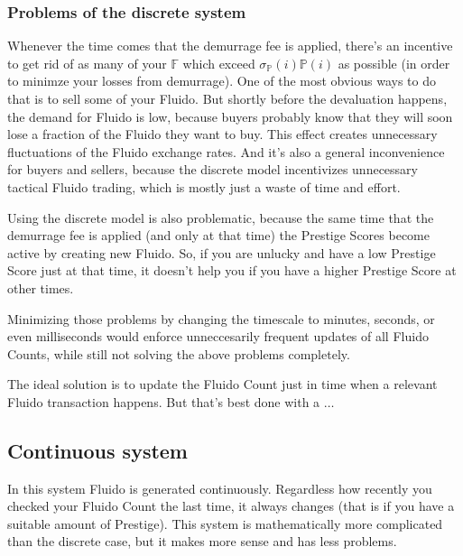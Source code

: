 \documentclass[a4paper,12pt]{scrartcl}
\begin{document}
\subsubsection{Problems of the discrete system}
Whenever the time comes that the demurrage fee is applied, there's an incentive to get rid of as many of your $\mathbb{F}$ which exceed $\sigma_{\mathbb{P}}(i)\mathbb{P}(i)$ as possible (in order to minimze your losses from demurrage). One of the most obvious ways to do that is to sell some of your Fluido. But shortly before the devaluation happens, the demand for Fluido is low, because buyers probably know that they will soon lose a fraction of the Fluido they want to buy. This effect creates unnecessary fluctuations of the Fluido exchange rates. And it's also a general inconvenience for buyers and sellers, because the discrete model incentivizes unnecessary tactical Fluido trading, which is mostly just a waste of time and effort.

Using the discrete model is also problematic, because the same time that the demurrage fee is applied (and only at that time) the Prestige Scores become active by creating new Fluido. So, if you are unlucky and have a low Prestige Score just at that time, it doesn't help you if you have a higher Prestige Score at other times.

Minimizing those problems by changing the timescale to minutes, seconds, or even milliseconds would enforce unneccesarily frequent updates of all Fluido Counts, while still not solving the above problems completely.

The ideal solution is to update the Fluido Count just in time when a relevant Fluido transaction happens. But that's best done with a $\ldots$ 

\subsection{Continuous system}
In this system Fluido is generated continuously. Regardless how recently you checked your Fluido Count the last time, it always changes (that is if you have a suitable amount of Prestige). This system is mathematically more complicated than the discrete case, but it makes more sense and has less problems.
\end{document}
